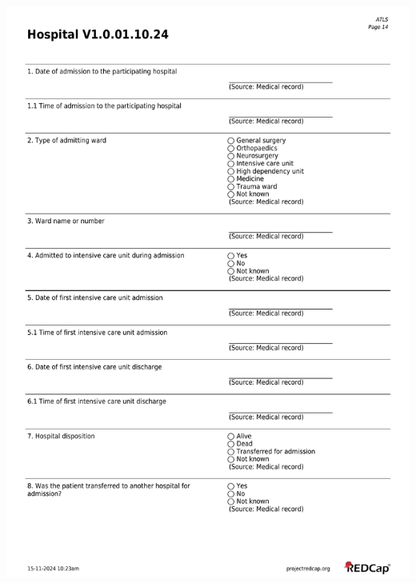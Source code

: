 \documentclass[
]{scrartcl}
\begin{document}
\includegraphics{../case-record-form/instrument-pdfs/pages/all-instruments-14.pdf}
\end{document}
